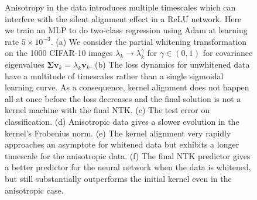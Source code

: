 \documentclass{article} %
\begin{document}
\begin{figure}[ht]
    \centering
    \caption{Anisotropy in the data introduces multiple timescales which can interfere with the silent alignment effect in a ReLU network. Here we train an MLP to do two-class regression using Adam at learning rate $5\times 10^{-3}$. (a) We consider the partial whitening transformation on the 1000 CIFAR-10 images $\lambda_k \to \lambda_k^{\gamma}$ for $\gamma \in (0,1)$ for covariance eigenvalues $\bm\Sigma \bm v_k = \lambda_k \bm v_k$. (b) The loss dynamics for unwhitened data have a multitude of timescales rather than a single sigmoidal learning curve. As a consequence, kernel alignment does not happen all at once before the loss decreases and the final solution is not a kernel machine with the final NTK. (c) The test error on classification.  (d) Anisotropic data gives a slower evolution in the kernel's Frobenius norm. (e) The kernel alignment very rapidly approaches an asymptote for whitened data but exhibits a longer timescale for the anisotropic data. (f) The final NTK predictor gives a better predictor for the neural network when the data is whitened, but still substantially outperforms the initial kernel even in the anisotropic case.  }
    \label{fig:cifar_anisotropy_partial_whiten}
\end{figure}
\end{document}
